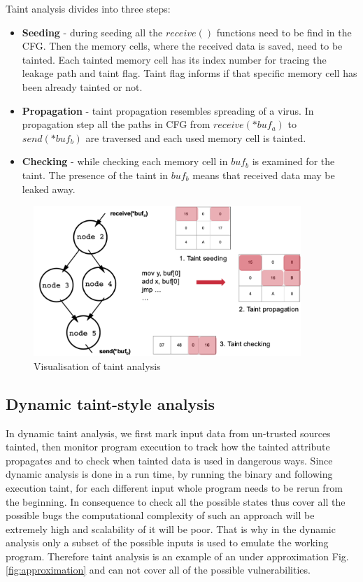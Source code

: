 \documentclass[a4paper, 12pt, journal, onecolumn]{IEEEtran}
\begin{document}
Taint analysis divides into three steps:\\
\begin{itemize}
\item \textbf{Seeding} - during seeding all the $receive()$ functions need to be find in the CFG. Then the memory cells, where the received data is saved, need to be tainted. Each tainted memory cell has its index number for tracing the leakage path and taint flag. Taint flag informs if that specific memory cell has been already tainted or not.\\
\item \textbf{Propagation} - taint propagation resembles spreading of a virus. In propagation step all the paths in CFG from $receive(*buf_a)$ to $send(*buf_b)$ are traversed and each used memory cell is tainted.\\
\item \textbf{Checking} - while checking each memory cell in $buf_b$ is examined for the taint. The presence of the taint in $buf_b$ means that received data may be leaked away.\\
\end{itemize}

\begin{figure}[ht]
    \centering
    \captionsetup{justification=centering}
    \includegraphics[width=0.9\textwidth]{Taint.png}
    \caption{Visualisation of taint analysis}
    \label{fig:taint}
\end{figure}

\subsection{Dynamic taint-style analysis}

In dynamic taint analysis, we first mark input data from un-trusted sources tainted, then monitor program execution to track how the tainted attribute propagates and to check when tainted data is used in dangerous ways. \cite{taint2}
Since dynamic analysis is done in a run time, by running the binary and following execution taint, for each different input whole program needs to be rerun from the beginning. In consequence to check all the possible states thus cover all the possible bugs the computational complexity of such an approach will be extremely high and scalability of it will be poor. That is why in the dynamic analysis only a subset of the possible inputs is used to emulate the working program. Therefore taint analysis is an example of an under approximation Fig.\ref{fig:approximation} and can not cover all of the possible vulnerabilities. \cite{a6}\cite{a7}
\end{document}
